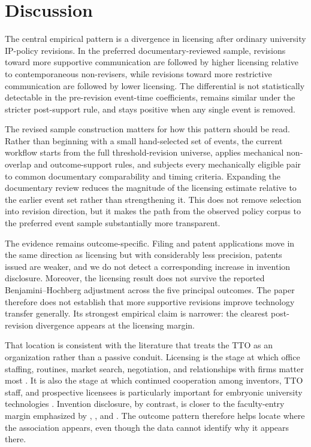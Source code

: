 \section{Discussion}\label{sec:discussion}

The central empirical pattern is a divergence in licensing after ordinary university IP-policy revisions. In the preferred documentary-reviewed sample, revisions toward more supportive communication are followed by higher licensing relative to contemporaneous non-revisers, while revisions toward more restrictive communication are followed by lower licensing. The differential is not statistically detectable in the pre-revision event-time coefficients, remains similar under the stricter post-support rule, and stays positive when any single event is removed.

The revised sample construction matters for how this pattern should be read. Rather than beginning with a small hand-selected set of events, the current workflow starts from the full threshold-revision universe, applies mechanical non-overlap and outcome-support rules, and subjects every mechanically eligible pair to common documentary comparability and timing criteria. Expanding the documentary review reduces the magnitude of the licensing estimate relative to the earlier event set rather than strengthening it. This does not remove selection into revision direction, but it makes the path from the observed policy corpus to the preferred event sample substantially more transparent.

The evidence remains outcome-specific. Filing and patent applications move in the same direction as licensing but with considerably less precision, patents issued are weaker, and we do not detect a corresponding increase in invention disclosure. Moreover, the licensing result does not survive the reported Benjamini--Hochberg adjustment across the five principal outcomes. The paper therefore does not establish that more supportive revisions improve technology transfer generally. Its strongest empirical claim is narrower: the clearest post-revision divergence appears at the licensing margin.

That location is consistent with the literature that treats the TTO as an organization rather than a passive conduit. Licensing is the stage at which office staffing, routines, market search, negotiation, and relationships with firms matter most \citep{SiegelWaldmanLink2003,ThursbyKemp2002,MarkmanEtAl2005}. It is also the stage at which continued cooperation among inventors, TTO staff, and prospective licensees is particularly important for embryonic university technologies \citep{JensenThursby2001}. Invention disclosure, by contrast, is closer to the faculty-entry margin emphasized by \citet{JensenThursbyThursby2003}, \citet{OwenSmithPowell2001}, and \citet{BercovitzFeldman2008}. The outcome pattern therefore helps locate where the association appears, even though the data cannot identify why it appears there.

